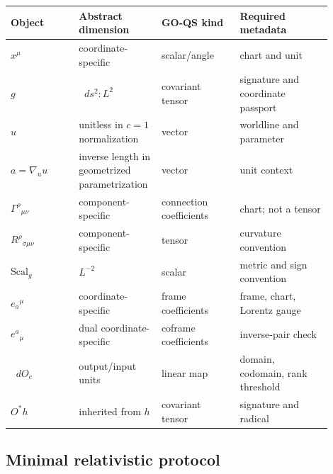 \documentclass[11pt,a4paper]{article}
\theoremstyle{definition}
\theoremstyle{plain}
\theoremstyle{remark}
\newcommand{\dd}{\mathop{}\!d}
\begin{document}
\begin{longtable}{L{0.20\linewidth}L{0.19\linewidth}L{0.23\linewidth}L{0.279\linewidth}}
\toprule
Object & Abstract dimension & GO-QS kind & Required metadata\\
\midrule
\endhead
$x^\mu$ & coordinate-specific & scalar/angle & chart and unit\\
$g$ & $\dd s^2:L^2$ & covariant tensor & signature and coordinate passport\\
$u$ & unitless in $c=1$ normalization & vector & worldline and parameter\\
$a=\nabla_u u$ & inverse length in geometrized parametrization &
vector & unit context\\
$\Gamma^\rho{}_{\mu\nu}$ & component-specific & connection coefficients &
chart; not a tensor\\
$R^\rho{}_{\sigma\mu\nu}$ & component-specific & tensor &
curvature convention\\
$\mathrm{Scal}_g$ & $L^{-2}$ & scalar & metric and sign convention\\
$e_a{}^\mu$ & coordinate-specific & frame coefficients &
frame, chart, Lorentz gauge\\
$e^a{}_\mu$ & dual coordinate-specific & coframe coefficients &
inverse-pair check\\
$\dd O_e$ & output/input units & linear map & domain, codomain, rank threshold\\
$O^*h$ & inherited from $h$ & covariant tensor & signature and radical\\
\bottomrule
\end{longtable}

\subsection{Minimal relativistic protocol}
\end{document}

